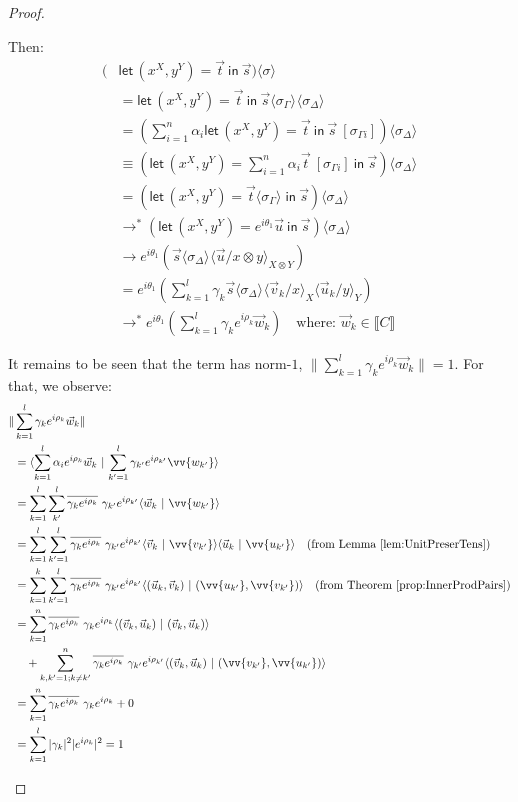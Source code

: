 \documentclass[a4paper,UKenglish,numberwithinsect,pdfa,anonymous]{lipics-v2021}
\theoremstyle{restatestyle}
\newcommand\lra{\longrightarrow}
\newcommand\ansubst[2]{\ensuremath{\langle #1 \rangle_{#2}}}
\def\scal#1#2{\langle{#1}~|~{#2}\rangle}
\def\Pair#1#2{(#1,#2)} %
\def\letkeyword{\mathsf{let}}
\def\inkeyword{\mathsf{in}}
\def\LetP#1#2#3#4#5#6{\letkeyword\,\Pair{#1^{#2}}{#3^{#4}}=#5~\inkeyword~#6}
\def\eval{\lra^*}
\def\sem#1{\llbracket#1\rrbracket}
\begin{document}
\begin{proof}
\begin{description}
    Then:
    \begin{align*}
        (&\LetP{x}{X}{y}{Y}{\vec{t}}{\vec{s}})\ansubst{\sigma}{} \\
        &= \LetP{x}{X}{y}{Y}{\vec{t}}{\vec{s}}\ansubst{\sigma_\Gamma}{}\ansubst{\sigma_\Delta}{}\\
        &=(\sum_{i=1}^{n}\alpha_i\LetP{x}{X}{y}{Y}{\vec{t}}{\vec{s}}\ [\sigma_{\Gamma i}])\ansubst{\sigma_{\Delta}}{}\\
        &\equiv (\LetP{x}{X}{y}{Y}{\sum_{i=1}^{n}\alpha_i\vec{t}\ [\sigma_{\Gamma i}]}{\vec{s}})\ansubst{\sigma_\Delta}{}\\
        &=(\LetP{x}{X}{y}{Y}{\vec{t}\ansubst{\sigma_\Gamma}{}}{\vec{s}})\ansubst{\sigma_\Delta}{}\\
        &\eval(\LetP{x}{X}{y}{Y}{e^{i\theta_1}\vec{u}}{\vec{s}})\ansubst{\sigma_\Delta}{}\\
        &\lra e^{i\theta_1}(\vec{s}\ansubst{\sigma_\Delta}{}\ansubst{\vec{u}/x\otimes y}{X\otimes Y})\\
        &=e^{i\theta_1} (\sum_{k=1}^{l}\gamma_k\vec{s}\ansubst{\sigma_\Delta}{}\ansubst{\vec{v}_{k}/x}{X}\ansubst{\vec{u}_{k}/y}{Y})\\
        &\eval e^{i\theta_1} (\sum_{k=1}^{l}\gamma_k e^{i\rho_k} \vec{w}_{k})\quad\text{where: }\vec{w}_{k}\in\sem{C}
    \end{align*}

    It remains to be seen that the term has norm-$1$, $\|\sum_{k=1}^{l}\gamma_k e^{i\rho_k} \vec{w}_{k}\|=1$. For that, we observe:
    \begin{align*}
        \|&\sum_{k=1}^{l}\gamma_k e^{i\rho_k} \vec{w}_{k}\| \\
        &= \scal{\sum_{k=1}^{l}\alpha_i e^{i\rho_k} \vec{w}_{k}}{\sum_{k'=1}^{l}\gamma_{k'} e^{i\rho_{k'}} \vv{w_{k'}}}\\
        &= \sum_{k=1}^{l}\sum_{k'}^{l}\overline{\gamma_k e^{i\rho_k}}\  \gamma_{k'} e^{i\rho_{k'}}\scal{\vec{w}_{k}}{\vv{w_{k'}}}\\
        &=\sum_{k=1}^{l}\sum_{k'=1}^{l}\overline{\gamma_k e^{i\rho_k}}\ \gamma_{k'} e^{i\rho_{k'}} \scal{\vec{v}_{k}}{\vv{v_{k'}}}\scal{\vec{u}_{k}}{\vv{u_{k'}}}\quad(\text{from Lemma~\ref{lem:UnitPreserTens}})\\
        &= \sum_{k=1}^{k}\sum_{k'=1}^{l}\overline{\gamma_k e^{i\rho_k}}\  \gamma_{k'} e^{i\rho_{k'}} \scal{\Pair{\vec{u}_{k}}{\vec{v}_{k}}}{\Pair{\vv{u_{k'}}}{\vv{v_{k'}}}}\quad(\text{from Theorem~\ref{prop:InnerProdPairs}})\\
        &=\sum_{k=1}^n \overline{\gamma_k e^{i\rho_k}}\ \gamma_k e^{i\rho_k} \scal{\Pair{\vec{v}_{k}}{\vec{u}_{k}}}{\Pair{\vec{v}_{k}}{\vec{u}_{k}}} \\
        & \quad + \sum_{k,k'=1; k\neq k'}^n \overline{\gamma_k e^{i\rho_k}}\  \gamma_{k'} e^{i\rho_{k'}} \scal{\Pair{\vec{v}_{k}}{\vec{u}_{k}}}{\Pair{\vv{v_{k'}}}{\vv{u_{k'}}}}\\
        &= \sum_{k=1}^n \overline{\gamma_k e^{i\rho_k}}\ \gamma_k e^{i\rho_k} + 0 \\
        &= \sum_{k=1}^{l} |\gamma_k|^2 |e^{i\rho_k}|^2 = 1
    \end{align*}


\end{description}
\end{proof}
\end{document}
